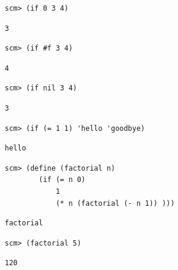 \documentclass{exam}
\begin{document}
\begin{questions}
\begin{blocksection}
\begin{lstlisting}
scm> (if 0 3 4)
\end{lstlisting}
\begin{solution}[.25in]
\begin{lstlisting}
3
\end{lstlisting}
\end{solution}

\end{blocksection}

\begin{blocksection}
\begin{lstlisting}
scm> (if #f 3 4)
\end{lstlisting}
\begin{solution}[.25in]
\begin{lstlisting}
4
\end{lstlisting}
\end{solution}

\begin{lstlisting}
scm> (if nil 3 4)
\end{lstlisting}
\begin{solution}[.25in]
\begin{lstlisting}
3
\end{lstlisting}
\end{solution}

\begin{lstlisting}
scm> (if (= 1 1) 'hello 'goodbye)
\end{lstlisting}
\begin{solution}[.25in]
\begin{lstlisting}
hello
\end{lstlisting}
\end{solution}

\begin{lstlisting}
scm> (define (factorial n)
        (if (= n 0)
            1
            (* n (factorial (- n 1)) )))
\end{lstlisting}
\begin{solution}[.25in]
\begin{lstlisting}
factorial
\end{lstlisting}
\end{solution}

\begin{lstlisting}
scm> (factorial 5)
\end{lstlisting}
\begin{solution}[.25in]
\begin{lstlisting}
120
\end{lstlisting}
\end{solution}


\end{blocksection}
\end{questions}
\end{document}
